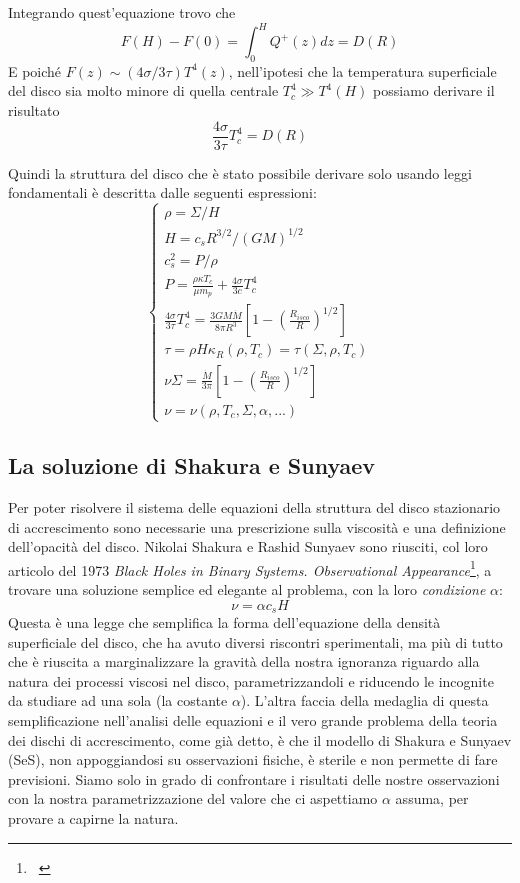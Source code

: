 \documentclass[a4paperbi]{article}
\begin{document}
	Integrando quest'equazione trovo che
	\begin{equation}
		F(H)-F(0)=\int_0^HQ^+(z)dz=D(R)
	\end{equation}
	E poiché $F(z)\sim(4\sigma/3\tau)T^4(z)$, nell'ipotesi che la temperatura superficiale del disco sia molto minore di quella centrale $T_c^4\gg T^4(H)$
	possiamo derivare il risultato
	\begin{equation}
		\frac{4\sigma}{3\tau}T^4_c=D(R)
	\end{equation}
	
	Quindi la struttura del disco che è stato possibile derivare solo usando leggi fondamentali è descritta dalle seguenti espressioni:
	\begin{equation}
	\begin{cases}
		\rho=\Sigma/H\\
		H=c_sR^{3/2}/(GM)^{1/2}\\
		c_s^2=P/\rho\\
		P=\frac{\rho\kappa T_c}{\mu m_p}+\frac{4\sigma}{3c}T_c^4\\
		\frac{4\sigma}{3\tau}T^4_c=\frac{3GM\dot{M}}{8\pi R^3}\left[1-\left(\frac{R_{isco}}{R}\right)^{1/2}\right]\\
		\tau=\rho H\kappa_R(\rho,T_c)=\tau(\Sigma,\rho,T_c)\\
		\nu\Sigma=\frac{\dot{M}}{3\pi}\left[1-\left(\frac{R_{isco}}{R}\right)^{1/2}\right]\\
		\nu=\nu(\rho,T_c,\Sigma,\alpha,...)		
	\end{cases}
	\end{equation}
		
\subsection{La soluzione di Shakura e Sunyaev}
	Per poter risolvere il sistema delle equazioni della struttura del disco stazionario di accrescimento sono necessarie una prescrizione sulla viscosità e una definizione dell'opacità del disco. Nikolai Shakura e Rashid Sunyaev sono riusciti, col loro articolo del 1973 \textit{Black Holes in Binary Systems. Observational Appearance}\footnote{~\cite{ShakuraSunyaev1973}}, a trovare una soluzione semplice ed elegante al problema, con la loro \textit{condizione} $\alpha$:
	\begin{equation}
		\nu=\alpha c_sH
	\end{equation}
Questa è una legge che semplifica la forma dell'equazione della densità superficiale del disco, che ha avuto diversi riscontri sperimentali, ma più di tutto che è riuscita a marginalizzare la gravità della nostra ignoranza riguardo alla natura dei processi viscosi nel disco, parametrizzandoli e riducendo le incognite da studiare ad una sola (la costante $\alpha$). L'altra faccia della medaglia di questa semplificazione nell'analisi delle equazioni e il vero grande problema della teoria dei dischi di accrescimento, come già detto, è che il modello di Shakura e Sunyaev (SeS), non appoggiandosi su osservazioni fisiche, è sterile e non permette di fare previsioni. Siamo solo in grado di confrontare i risultati delle nostre osservazioni con la nostra parametrizzazione del valore che ci aspettiamo $\alpha$ assuma, per provare a capirne la natura.
\end{document}
